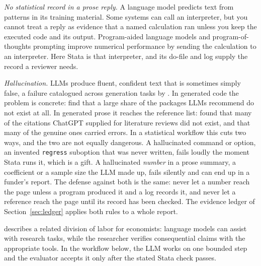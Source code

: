 \emph{No statistical record in a prose reply.} A language model predicts text from patterns in its training material. Some systems can call an interpreter, but you cannot treat a reply as evidence that a named calculation ran unless you keep the executed code and its output. Program-aided language models \parencite{gao2023pal} and program-of-thoughts prompting \parencite{chen2023pot} improve numerical performance by sending the calculation to an interpreter. Here Stata is that interpreter, and its do-file and log supply the record a reviewer needs.

\emph{Hallucination.} LLMs produce fluent, confident text that is sometimes simply false, a failure catalogued across generation tasks by \textcite{ji2023survey}. In generated code the problem is concrete: \textcite{spracklen2025packages} find that a large share of the packages LLMs recommend do not exist at all. In generated prose it reaches the reference list: \textcite{walters2023fabrication} found that many of the citations ChatGPT supplied for literature reviews did not exist, and that many of the genuine ones carried errors. In a statistical workflow this cuts two ways, and the two are not equally dangerous. A hallucinated command or option, an invented \texttt{regress} suboption that was never written, fails loudly the moment Stata runs it, which is a gift. A hallucinated \emph{number} in a prose summary, a coefficient or a sample size the LLM made up, fails silently and can end up in a funder's report. The defense against both is the same: never let a number reach the page unless a program produced it and a log records it, and never let a reference reach the page until its record has been checked. The evidence ledger of Section~\ref{sec:ledger} applies both rules to a whole report.

\textcite{korinek2023genai} describes a related division of labor for economists: language models can assist with research tasks, while the researcher verifies consequential claims with the appropriate tools. In the workflow below, the LLM works on one bounded step and the evaluator accepts it only after the stated Stata check passes.

